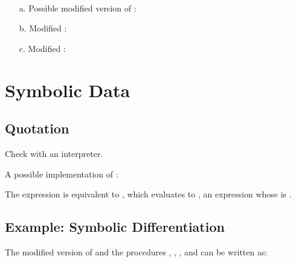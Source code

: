 \begin{exe}[2.52]
    \ \vspace{-20pt}
    \begin{itemize}
        \item[a.] Possible modified version of :
        \item[b.] Modified :
        \item[c.] Modified :
    \end{itemize}
\end{exe}

\section{Symbolic Data}

\subsection{Quotation}

\begin{exe}[2.53]
    Check with an interpreter.
\end{exe}

\begin{exe}[2.54]
    A possible implementation of :
\end{exe}

\begin{exe}[2.55]
    The expression  is equivalent to
    , which evaluates to
    , an expression whose  is .
\end{exe}

\subsection{Example: Symbolic Differentiation}

\begin{exe}[2.56]
    The modified version of  and the procedures 
    , , , and 
     can be written as:
\end{exe}

